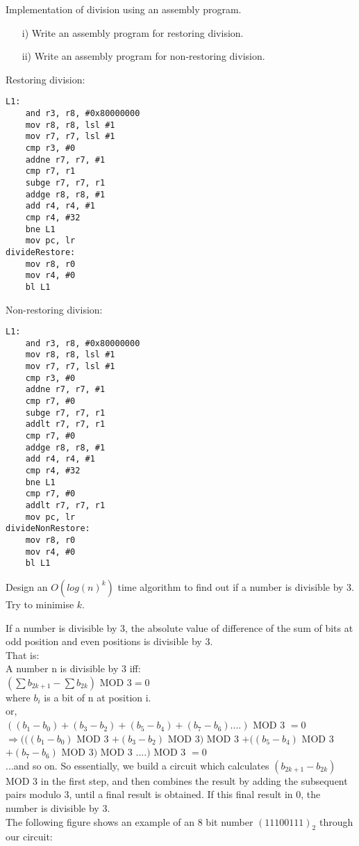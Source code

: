 \begin{ExerciseList}

\Exercise Implementation of division using an assembly program.
\begin{enumerate}
\item[i) ] Write an assembly program for restoring division.
\item[ii) ] Write an assembly program for non-restoring division.
\end{enumerate}

\Answer Restoring division:
\begin{Verbatim}[frame=single]
L1:
	and r3, r8, #0x80000000
	mov r8, r8, lsl #1
	mov r7, r7, lsl #1
	cmp r3, #0
	addne r7, r7, #1
	cmp r7, r1
	subge r7, r7, r1
	addge r8, r8, #1
	add r4, r4, #1
	cmp r4, #32
	bne L1
	mov pc, lr
divideRestore:
	mov r8, r0
	mov r4, #0
	bl L1
\end{Verbatim}


Non-restoring division:
\begin{Verbatim}[frame=single]
L1:
	and r3, r8, #0x80000000
	mov r8, r8, lsl #1
	mov r7, r7, lsl #1
	cmp r3, #0
	addne r7, r7, #1
	cmp r7, #0
	subge r7, r7, r1
	addlt r7, r7, r1
	cmp r7, #0
	addge r8, r8, #1
	add r4, r4, #1
	cmp r4, #32
	bne L1
	cmp r7, #0
	addlt r7, r7, r1
	mov pc, lr
divideNonRestore:
	mov r8, r0
	mov r4, #0
	bl L1
\end{Verbatim}

\Exercise[difficulty=1]
Design an $O(log(n)^k)$ time algorithm to find out if a number is divisible by 3. Try to minimise $k$. 

\Answer
If a number is divisible by 3, the absolute value of difference of the sum of bits at odd position and even positions is 
divisible by 3. \\
That is:\\
A number n is divisible by 3 iff:\\
$(\sum b_{2k+1} - \sum b_{2k})$ MOD $3 =0$\\
where $b_i$ is a bit of n at position i.\\
or,\\
$((b_1-b_0) + (b_3-b_2) + (b_5-b_4) + (b_7-b_6) .... )$ MOD 3 $= 0$\\
$\Rightarrow (((b_1-b_0)$ MOD 3 $+ (b_3-b_2)$ MOD 3$)$ MOD 3 $+ ((b_5-b_4)$ MOD 3 $+ (b_7-b_6)$ MOD 3$)$ MOD 3 $.... )$ MOD 3 $= 0 $\\ ...and so on.
So essentially, we build a circuit which calculates $(b_{2k+1} - b_{2k})$ MOD 3 in the first step, and then combines the
result by adding the subsequent pairs modulo 3, until a final result is obtained. If this final result in 0, the number
is divisible by 3.\\
The following figure shows an example of an 8 bit number $(11100111)_2$ through our circuit:\\


\end{ExerciseList}
